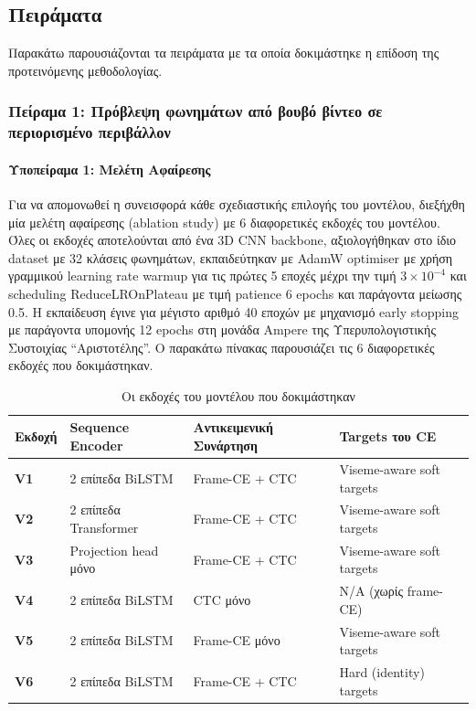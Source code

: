 \subsection{Πειράματα}

Παρακάτω παρουσιάζονται τα πειράματα με τα οποία δοκιμάστηκε η επίδοση της προτεινόμενης μεθοδολογίας. 

\subsubsection{Πείραμα 1: Πρόβλεψη φωνημάτων από βουβό βίντεο σε περιορισμένο περιβάλλον}
\label{Experiment1}

\paragraph{Υποπείραμα 1: Μελέτη Αφαίρεσης}

Για να απομονωθεί η συνεισφορά κάθε σχεδιαστικής επιλογής του μοντέλου, διεξήχθη μία μελέτη αφαίρεσης (ablation study) με 6 διαφορετικές εκδοχές του μοντέλου. Όλες οι εκδοχές αποτελούνται από ένα 3D CNN backbone, αξιολογήθηκαν στο ίδιο dataset με 32 κλάσεις φωνημάτων, εκπαιδεύτηκαν με AdamW optimiser με χρήση γραμμικού learning rate warmup για τις πρώτες 5 εποχές μέχρι την τιμή $3\times10^{-4}$ και scheduling ReduceLROnPlateau με τιμή patience 6 epochs και παράγοντα μείωσης 0.5. Η εκπαίδευση έγινε για μέγιστο αριθμό 40 εποχών με μηχανισμό early stopping με παράγοντα υπομονής 12 epochs στη μονάδα Ampere της Υπερυπολογιστικής Συστοιχίας ``Αριστοτέλης''. Ο παρακάτω πίνακας παρουσιάζει τις 6 διαφορετικές εκδοχές που δοκιμάστηκαν.

\begin{table}[htbp]
\centering
\caption{Οι εκδοχές του μοντέλου που δοκιμάστηκαν}
\label{tab:variants_summary}
\vspace{2mm}
\small
\begin{tabular}{|l|l|l|l|}
\hline
\textbf{Εκδοχή} & \textbf{Sequence Encoder} & \textbf{Αντικειμενική Συνάρτηση} & \textbf{Targets του CE} \\ \hline
\textbf{V1} & 2 επίπεδα BiLSTM & Frame-CE + CTC & Viseme-aware soft targets \\ \hline
\textbf{V2} & 2 επίπεδα Transformer & Frame-CE + CTC & Viseme-aware soft targets \\ \hline
\textbf{V3} & Projection head μόνο & Frame-CE + CTC & Viseme-aware soft targets \\ \hline
\textbf{V4} & 2 επίπεδα BiLSTM & CTC μόνο & N/A (χωρίς frame-CE) \\ \hline
\textbf{V5} & 2 επίπεδα BiLSTM & Frame-CE μόνο & Viseme-aware soft targets \\ \hline
\textbf{V6} & 2 επίπεδα BiLSTM & Frame-CE + CTC & Hard (identity) targets \\ \hline
\end{tabular}
\end{table}

